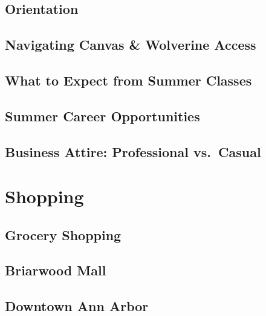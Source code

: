 \documentclass[
]{book}
\begin{document}
\hypertarget{orientation}{%
\section{Orientation}\label{orientation}}

\hypertarget{navigating-canvas-wolverine-access}{%
\section{Navigating Canvas \& Wolverine Access}\label{navigating-canvas-wolverine-access}}

\hypertarget{what-to-expect-from-summer-classes}{%
\section{What to Expect from Summer Classes}\label{what-to-expect-from-summer-classes}}

\hypertarget{summer-career-opportunities}{%
\section{Summer Career Opportunities}\label{summer-career-opportunities}}

\hypertarget{business-attire-professional-vs.-casual}{%
\section{Business Attire: Professional vs.~Casual}\label{business-attire-professional-vs.-casual}}

\hypertarget{shopping}{%
\chapter{Shopping}\label{shopping}}

\hypertarget{grocery-shopping}{%
\section{Grocery Shopping}\label{grocery-shopping}}

\hypertarget{briarwood-mall}{%
\section{Briarwood Mall}\label{briarwood-mall}}

\hypertarget{downtown-ann-arbor}{%
\section{Downtown Ann Arbor}\label{downtown-ann-arbor}}
\end{document}
